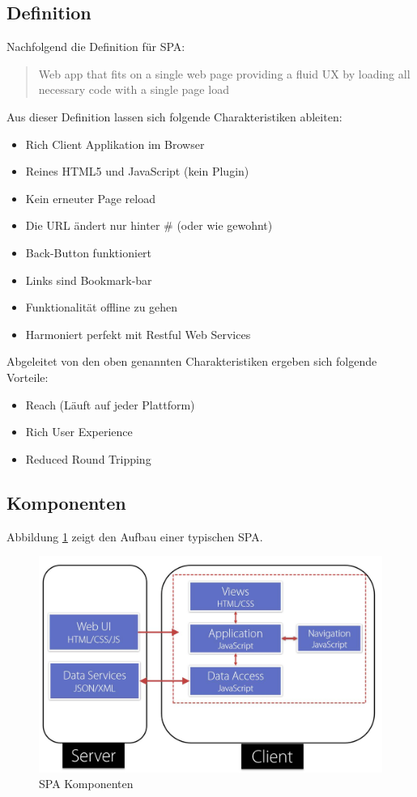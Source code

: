 \subsection{Definition}

Nachfolgend die Definition für SPA:
\begin{quote}
	Web app that fits on a single web page
	providing a fluid UX by loading all necessary
	code with a single page load
\end{quote}
Aus dieser Definition lassen sich folgende Charakteristiken ableiten:
\begin{itemize}
	\item Rich Client Applikation im Browser
	\item Reines HTML5 und JavaScript (kein Plugin)
	\item Kein erneuter Page reload
	\item  Die URL ändert nur hinter \# (oder wie gewohnt)
	\item Back-Button funktioniert
	\item Links sind Bookmark-bar
	\item Funktionalität offline zu gehen
	\item Harmoniert perfekt mit Restful Web Services
\end{itemize}
Abgeleitet von den oben genannten Charakteristiken ergeben sich folgende Vorteile:
\begin{itemize}
	\item Reach (Läuft auf jeder Plattform)
	\item Rich User Experience
	\item Reduced Round Tripping
\end{itemize}

\subsection{Komponenten}

Abbildung \ref{fig:spa-komponenten} zeigt den Aufbau einer typischen SPA.

\begin{figure}[h!]
\centering
\includegraphics[width=0.7\linewidth]{fig/spa-komponenten}
\caption{SPA Komponenten}
\label{fig:spa-komponenten}
\end{figure}

